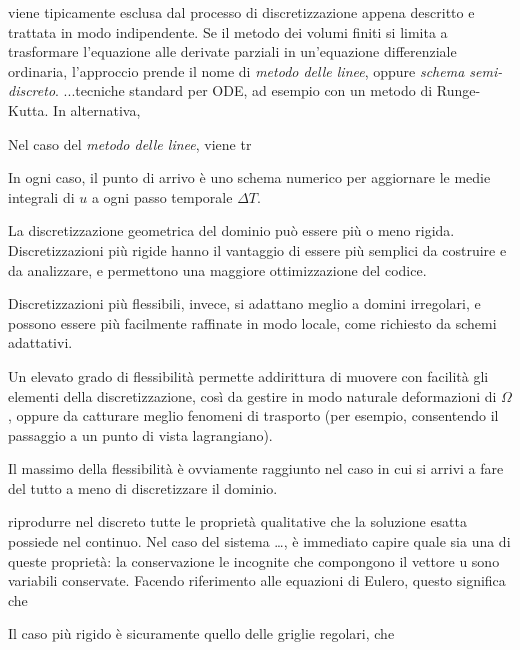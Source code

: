 viene tipicamente esclusa dal processo di discretizzazione appena descritto
e trattata in modo indipendente.
Se il metodo dei volumi finiti si limita a trasformare
l'equazione alle derivate parziali in un'equazione differenziale
ordinaria, l'approccio prende il nome di \emph{metodo delle linee},
oppure \emph{schema semi-discreto}.
...tecniche standard per ODE, ad esempio con un metodo di Runge-Kutta.
In alternativa, 

Nel caso del \emph{metodo delle linee}, 
viene tr


In ogni caso, il punto di arrivo è uno schema numerico
per aggiornare le medie integrali di $u$ a ogni passo temporale $\Delta T$.

\clearpage





La discretizzazione geometrica del dominio può essere più o meno rigida.
Discretizzazioni più rigide hanno il vantaggio di 
essere più semplici da costruire e da analizzare,
e permettono una maggiore ottimizzazione del codice.

Discretizzazioni più flessibili, invece, si adattano
meglio a domini irregolari, e possono essere più facilmente
raffinate in modo locale, come richiesto da schemi adattativi.

Un elevato grado di flessibilità permette addirittura
di muovere con facilità gli elementi della discretizzazione,
così da gestire in modo naturale deformazioni di $\Omega$,
oppure da catturare meglio fenomeni di trasporto
(per esempio, consentendo il passaggio a un punto di vista lagrangiano).

Il massimo della flessibilità è ovviamente raggiunto nel caso
in cui si arrivi a fare del tutto a meno di discretizzare
il dominio.






riprodurre nel discreto tutte le proprietà qualitative che la
soluzione esatta possiede nel continuo.
Nel caso del sistema \dots, è immediato capire quale
sia una di queste proprietà: la conservazione
le incognite che compongono il vettore u sono variabili conservate.
Facendo riferimento alle equazioni di Eulero, questo significa
che 





Il caso più rigido è sicuramente quello delle griglie regolari,
che 






